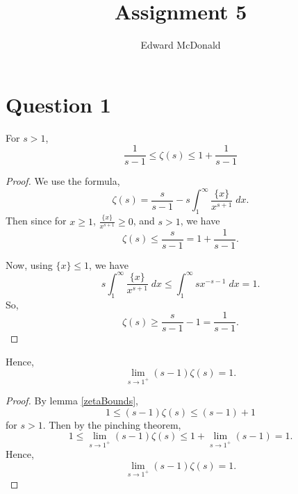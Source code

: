 \documentclass{unswmaths}
\begin{document}
\subject{Number Theory}
\author{Edward McDonald}
\title{Assignment 5}


\setlength\parindent{0pt}

\newcommand{\Unit}{\mathbb{U}}
\newcommand{\modulo}[1]{\;\operatorname{mod}\;#1}
\newcommand{\pprime}{{p\text{ prime}}}

\unswtitle{}


\section*{Question 1}
    \begin{lemma}
    \label{zetaBounds}
        For $s > 1$, 
        \begin{equation*}
            \frac{1}{s-1} \leq \zeta(s) \leq 1+\frac{1}{s-1}
        \end{equation*}
    \end{lemma}
    \begin{proof}
        We use the formula,
        \begin{equation*}
            \zeta(s) = \frac{s}{s-1}-s\int_{1}^\infty \frac{\{x\}}{x^{s+1}}\;dx.
        \end{equation*}
        Then since for $x \geq 1$, $\frac{\{x\}}{x^{s+1}} \geq 0$, and $s > 1$, we have
        \begin{equation*}
            \zeta(s) \leq \frac{s}{s-1} = 1 + \frac{1}{s-1}.
        \end{equation*}
        
        Now, using $\{x\} \leq 1$, we have
        \begin{equation*}
            s\int_1^\infty \frac{\{x\}}{x^{s+1}}\;dx \leq \int_{1}^\infty sx^{-s-1}\;dx = 1.
        \end{equation*}
        So,
        \begin{equation*}
            \zeta(s) \geq \frac{s}{s-1}-1 = \frac{1}{s-1}.
        \end{equation*}
    \end{proof}
    
    \begin{lemma}
        Hence,
        \begin{equation*}
            \lim_{s\rightarrow 1^+} (s-1)\zeta(s) = 1.
        \end{equation*}
    \end{lemma}
    \begin{proof}
        By lemma \ref{zetaBounds}, 
        \begin{equation*}
            1 \leq (s-1)\zeta(s) \leq (s-1)+1
        \end{equation*}
        for $s > 1$. Then by the pinching theorem,
        \begin{equation*}
            1 \leq \lim_{s\rightarrow 1^+} (s-1)\zeta(s) \leq 1+\lim_{s\rightarrow 1^+}(s-1) = 1.
        \end{equation*}
        Hence,
        \begin{equation*}
            \lim_{s\rightarrow 1^+} (s-1)\zeta(s) = 1.
        \end{equation*}      
    \end{proof}
    
\end{document}
